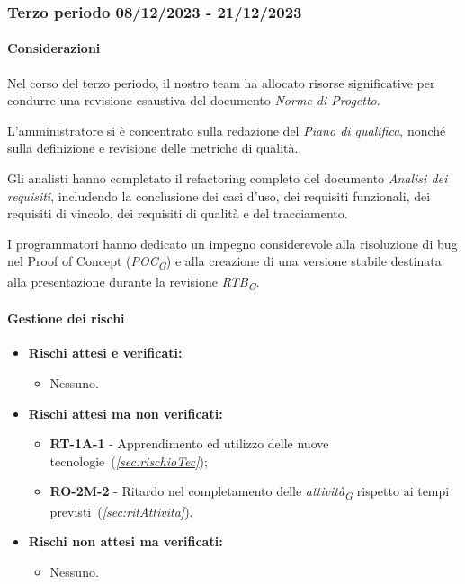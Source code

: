 

\subsubsection{Terzo periodo  08/12/2023 - 21/12/2023}
\paragraph{Considerazioni}
Nel corso del terzo periodo, il nostro team ha allocato risorse significative per condurre una revisione esaustiva del documento \textit{Norme di Progetto}.

\vspace{0.2cm}

L'amministratore si è concentrato sulla redazione del \textit{Piano di qualifica}, nonché sulla definizione e revisione delle metriche di qualità. 

\vspace{0.2cm}

Gli analisti hanno completato il refactoring completo del documento \textit{Analisi dei requisiti}, includendo la conclusione dei casi d'uso, dei requisiti funzionali, dei requisiti di vincolo, dei requisiti di qualità e del tracciamento.

\vspace{0.2cm}

I programmatori hanno dedicato un impegno considerevole alla risoluzione di bug nel Proof of Concept (\textit{POC}\textsubscript{\textit{G}}) e alla creazione di una versione stabile destinata alla presentazione durante la revisione \textit{RTB}\textsubscript{\textit{G}}.

\paragraph{Gestione dei rischi} 

\begin{itemize}
    \item \textbf{Rischi attesi e verificati:}
\begin{itemize}
    \item Nessuno.
\end{itemize}
\item \textbf{Rischi attesi ma non verificati:}
 \begin{itemize}
    \item \textbf{RT-1A-1} - Apprendimento ed utilizzo delle nuove tecnologie~(\textit{\ref{sec:rischioTec}});
    \item \textbf{RO-2M-2} - Ritardo nel completamento delle \textit{attività}\textsubscript{\textit{G}} rispetto ai tempi previsti~(\textit{\ref{sec:ritAttivita}}).
\end{itemize}
\item \textbf{Rischi non attesi ma verificati:}
\begin{itemize}
    \item Nessuno.
\end{itemize}
\end{itemize}
